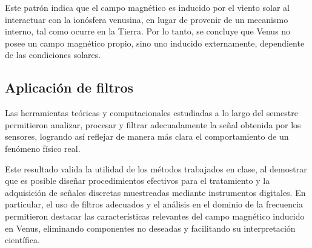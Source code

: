 \documentclass[letterpaper,11pt]{article}
\begin{document}
                Este patrón indica que el campo magnético es inducido por el viento solar al interactuar con la ionósfera venusina, en lugar de provenir de un mecanismo interno, tal como ocurre en la Tierra. Por lo tanto, se concluye que Venus no posee un campo magnético propio, sino uno inducido externamente, dependiente de las condiciones solares.

  
	  \subsection{Aplicación de filtros}
	  	  Las herramientas teóricas y computacionales estudiadas a lo largo del semestre permitieron analizar, procesar y filtrar adecuadamente la señal obtenida por los sensores, logrando así reflejar de manera más clara el comportamiento de un fenómeno físico real.
            
            Este resultado valida la utilidad de los métodos trabajados en clase, al demostrar que es posible diseñar procedimientos efectivos para el tratamiento y la adquisición de señales discretas muestreadas mediante instrumentos digitales. En particular, el uso de filtros adecuados y el análisis en el dominio de la frecuencia permitieron destacar las características relevantes del campo magnético inducido en Venus, eliminando componentes no deseadas y facilitando su interpretación científica.
	    
\end{document}
